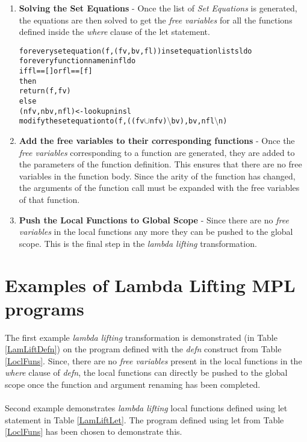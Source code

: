 \documentclass[11pt]{article}
\begin{document}
\begin{enumerate}
    \item {\bf Solving the Set Equations} - Once the list of {\em Set Equations} is generated, the equations are then solved to get the {\em free variables} for all the functions defined inside the {\em where} clause of the {\sf let} statement.
    \begin{alltt}
    for every set equation (f,(fv,bv,fl)) in set equation list sl do 
        for every function name n in fl do
            if fl == [] or fl == [f] 
               then
                 return (f,fv) 
               else      
                (nfv,nbv,nfl)  <- lookup n in sl
                modify the set equation to (f,((fv \(\cup\) nfv) \(\setminus\) bv), bv, nfl \(\setminus\)n)        
    \end{alltt}
 
    \item {\bf Add the free variables to their corresponding functions} - Once the {\em free variables} corresponding to a function are generated, they are added to the parameters of the function definition. This ensures that there are no free variables in the function body. Since the arity of the function has changed, the arguments of the function call must be expanded with the free variables of that function. 

    \item {\bf Push the Local Functions to Global Scope} - Since there are no {\em free variables} in the local functions any more they can be pushed to the global scope. This is the final step in the {\em lambda lifting} transformation.
\end{enumerate}
\section {Examples of Lambda Lifting MPL programs}

The first example {\em lambda lifting} transformation is demonstrated (in Table \ref  {LamLiftDefn}) on the program defined with the {\em defn} construct from Table \ref {LoclFuns}. Since, there are no {\em free variables} present in the local functions in the  {\em where} clause of {\em defn}, the local functions can directly be pushed to the global scope once the function and argument renaming has been completed.
~~\\~~\\
Second example demonstrates {\em lambda lifting} local functions defined using {\sf let} statement in Table \ref {LamLiftLet}. The program defined using {\sf let} from Table \ref{LoclFuns}  has been chosen to demonstrate this.
\end{document}
